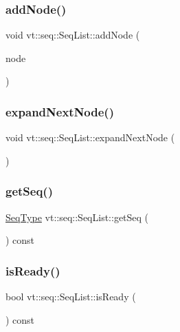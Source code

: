 \subsubsection{\texorpdfstring{add\+Node()}{addNode()}}
{\footnotesize\ttfamily void vt\+::seq\+::\+Seq\+List\+::add\+Node (\begin{DoxyParamCaption}\item[{\hyperlink{namespacevt_1_1seq_ae6a4874b585be0612aaca32ca6d2d191}{Seq\+Node\+Ptr\+Type}}]{node }\end{DoxyParamCaption})}

\mbox{\label{structvt_1_1seq_1_1_seq_list_a248ddc60ef237ccc041e9fb66881457f}} 
\subsubsection{\texorpdfstring{expand\+Next\+Node()}{expandNextNode()}}
{\footnotesize\ttfamily void vt\+::seq\+::\+Seq\+List\+::expand\+Next\+Node (\begin{DoxyParamCaption}{ }\end{DoxyParamCaption})}

\mbox{\label{structvt_1_1seq_1_1_seq_list_ab1ddc27b4429eb899519bb75335d0882}} 
\subsubsection{\texorpdfstring{get\+Seq()}{getSeq()}}
{\footnotesize\ttfamily \hyperlink{namespacevt_1_1seq_a3b612da217ac669d39c159f134ab8434}{Seq\+Type} vt\+::seq\+::\+Seq\+List\+::get\+Seq (\begin{DoxyParamCaption}{ }\end{DoxyParamCaption}) const}

\mbox{\label{structvt_1_1seq_1_1_seq_list_a05b00ac5a6b957354c0ec8af681909b6}} 
\subsubsection{\texorpdfstring{is\+Ready()}{isReady()}}
{\footnotesize\ttfamily bool vt\+::seq\+::\+Seq\+List\+::is\+Ready (\begin{DoxyParamCaption}{ }\end{DoxyParamCaption}) const}


